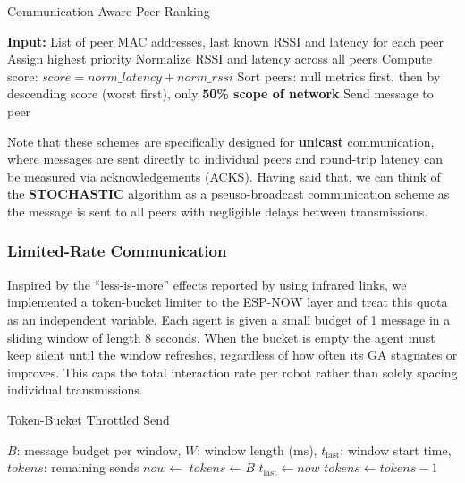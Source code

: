 \documentclass[conference]{IEEEtran}
\begin{document}
\begin{algorithm}[H]
\caption{Communication-Aware Peer Ranking}
\begin{algorithmic}[1]
\State \textbf{Input:} List of peer MAC addresses, last known RSSI and latency for each peer
        \State Assign highest priority
    \Else
        \State Normalize RSSI and latency across all peers
        \State Compute score: $score = norm\_latency + norm\_rssi$
    \EndIf
\EndFor
\State Sort peers: null metrics first, then by descending score (worst first), only \textbf{50\% scope of network}
        \State Send message to peer
    \EndIf
\EndFor
\end{algorithmic}
\end{algorithm}

Note that these schemes are specifically designed for \textbf{unicast} communication, where messages are sent directly to individual peers and round-trip latency can be measured via acknowledgements (ACKS). Having said that, we can think of the \textbf{STOCHASTIC} algorithm as a pseuso-broadcast communication scheme as the message is sent to all peers with negligible delays between transmissions.\\ 

\subsubsection{Limited-Rate Communication}\label{sec:limited-rate}

Inspired by the “less-is-more” effects reported by \cite{aust_hidden_2022} using infrared links, we implemented a token-bucket limiter to the ESP-NOW layer and treat this quota as an independent variable. Each agent is given a small budget of 1 message in a sliding window of length 8 seconds.  When the bucket is empty the agent must keep silent until the window refreshes, regardless of how often its GA stagnates or improves.  This caps the total interaction rate per robot rather than solely spacing individual transmissions.

\begin{algorithm}[H]
\caption{Token-Bucket Throttled Send}
\label{alg:token_bucket}
\begin{algorithmic}[1]
\Require 
  $B$: message budget per window, \quad
  $W$: window length (ms), \quad
  $t_{\mathrm{last}}$: window start time, \quad
  $\mathit{tokens}$: remaining sends
  \State $now \gets$ 
   
    \State $\mathit{tokens} \gets B$
    \State $t_{\mathrm{last}} \gets now$
  \EndIf
    \State \Return {}
  \EndIf
    \State $\mathit{tokens} \gets \mathit{tokens} - 1$
    \State {}
  \EndIf
\EndProcedure
\end{algorithmic}
\end{algorithm}
\end{document}
